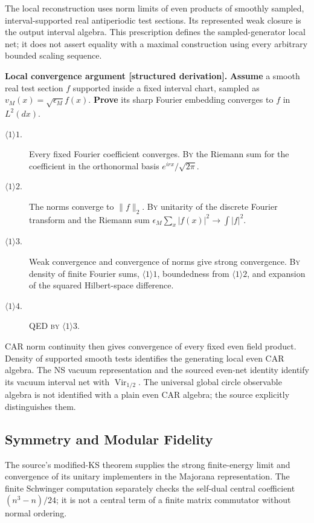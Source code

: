 The local reconstruction uses norm limits of even products of smoothly
sampled, interval-supported real antiperiodic test sections. Its represented
weak closure is the output interval algebra. This prescription defines the
sampled-generator local net; it does not assert equality with a maximal
construction using every arbitrary bounded scaling sequence.

\textbf{Local convergence argument [structured derivation].}
\textbf{Assume} a smooth real test section $f$ supported inside a fixed
interval chart, sampled as $v_M(x)=\sqrt{\epsilon_M}f(x)$.
\textbf{Prove} its sharp Fourier embedding converges to $f$ in $L^2(dx)$.
\begin{description}
\item[$\langle1\rangle1$.] Every fixed Fourier coefficient converges.
\textsc{By} the Riemann sum for the coefficient in the orthonormal basis
$e^{irx}/\sqrt{2\pi}$.
\item[$\langle1\rangle2$.] The norms converge to $\|f\|_2$.
\textsc{By} unitarity of the discrete Fourier transform and the Riemann sum
$\epsilon_M\sum_x|f(x)|^2\to\int|f|^2$.
\item[$\langle1\rangle3$.] Weak convergence and convergence of norms
give strong convergence. \textsc{By} density of finite Fourier sums,
$\langle1\rangle1$, boundedness from $\langle1\rangle2$, and expansion
of the squared Hilbert-space difference.
\item[$\langle1\rangle4$.] QED \textsc{by} $\langle1\rangle3$.
\end{description}
CAR norm continuity then gives convergence of every fixed even field
product. Density of supported smooth tests identifies the generating local
even CAR algebra. The NS vacuum representation and the sourced even-net
identity identify its vacuum interval net with $\operatorname{Vir}_{1/2}$.
The universal global circle observable algebra is not identified with a plain
even CAR algebra; the source explicitly distinguishes them.

\subsection{Symmetry and Modular Fidelity}

The source's modified-KS theorem supplies the strong finite-energy limit
and convergence of its unitary implementers in the Majorana representation.
The finite Schwinger computation separately checks the self-dual central
coefficient $(n^3-n)/24$; it is not a central term of a finite matrix
commutator without normal ordering.

